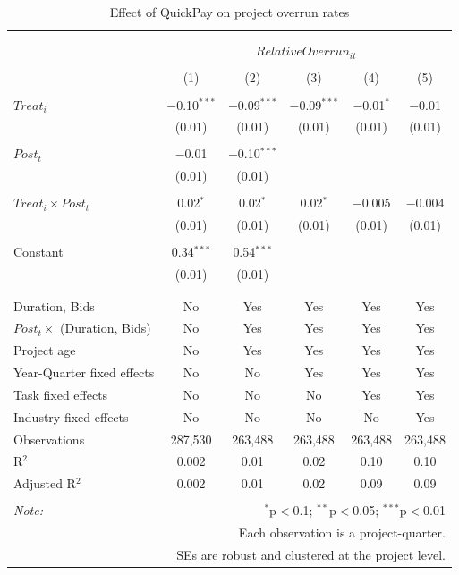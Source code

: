 \documentclass[
]{article}
\begin{document}
\begin{table}[H] \centering 
  \caption{Effect of QuickPay on project overrun rates} 
  \label{} 
\small 
\begin{tabular}{@{\extracolsep{-2pt}}lccccc} 
\\[-1.8ex]\hline 
\hline \\[-1.8ex] 
\\[-1.8ex] & \multicolumn{5}{c}{$RelativeOverrun_{it}$} \\ 
\\[-1.8ex] & (1) & (2) & (3) & (4) & (5)\\ 
\hline \\[-1.8ex] 
 $Treat_i$ & $-$0.10$^{***}$ & $-$0.09$^{***}$ & $-$0.09$^{***}$ & $-$0.01$^{*}$ & $-$0.01 \\ 
  & (0.01) & (0.01) & (0.01) & (0.01) & (0.01) \\ 
  & & & & & \\ 
 $Post_t$ & $-$0.01 & $-$0.10$^{***}$ &  &  &  \\ 
  & (0.01) & (0.01) &  &  &  \\ 
  & & & & & \\ 
 $Treat_i \times Post_t$ & 0.02$^{*}$ & 0.02$^{*}$ & 0.02$^{*}$ & $-$0.005 & $-$0.004 \\ 
  & (0.01) & (0.01) & (0.01) & (0.01) & (0.01) \\ 
  & & & & & \\ 
 Constant & 0.34$^{***}$ & 0.54$^{***}$ &  &  &  \\ 
  & (0.01) & (0.01) &  &  &  \\ 
  & & & & & \\ 
\hline \\[-1.8ex] 
Duration, Bids & No & Yes & Yes & Yes & Yes \\ 
$Post_t \times$  (Duration, Bids) & No & Yes & Yes & Yes & Yes \\ 
Project age & No & Yes & Yes & Yes & Yes \\ 
Year-Quarter fixed effects & No & No & Yes & Yes & Yes \\ 
Task fixed effects & No & No & No & Yes & Yes \\ 
Industry fixed effects & No & No & No & No & Yes \\ 
Observations & 287,530 & 263,488 & 263,488 & 263,488 & 263,488 \\ 
R$^{2}$ & 0.002 & 0.01 & 0.02 & 0.10 & 0.10 \\ 
Adjusted R$^{2}$ & 0.002 & 0.01 & 0.02 & 0.09 & 0.09 \\ 
\hline 
\hline \\[-1.8ex] 
\textit{Note:}  & \multicolumn{5}{r}{$^{*}$p$<$0.1; $^{**}$p$<$0.05; $^{***}$p$<$0.01} \\ 
 & \multicolumn{5}{r}{Each observation is a project-quarter.} \\ 
 & \multicolumn{5}{r}{SEs are robust and clustered at the project level.} \\ 
\end{tabular} 
\end{table}
\end{document}
